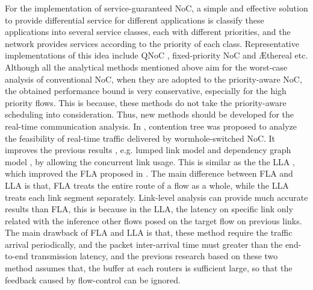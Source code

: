 \documentclass[10pt,journal]{IEEEtran}
\begin{document}
For the implementation of service-guaranteed NoC, a simple and effective solution to provide differential service for different applications is classify these applications into several service classes, each with different priorities, and the network provides services according to the priority of each class. Representative implementations of this idea include QNoC \cite{BCGK04}, fixed-priority NoC \cite{5685465} and {{\AE}thereal} \cite{GoDR05}\cite{RiGW01} etc. Although all the analytical methods mentioned above aim for the worst-case analysis of conventional NoC, when they are adopted to the priority-aware NoC, the obtained performance bound is very conservative, especially for the high priority flows. This is because, these methods do not take the priority-aware scheduling into consideration. Thus, new methods should be developed for the real-time communication analysis. In \cite{LuJS05}, contention tree was proposed to analyze the feasibility of real-time traffic delivered by wormhole-switched NoC. It improves the previous results , e.g. lumped link model \cite{707545} and dependency graph model \cite{708526}, by allowing the concurrent link usage. This is similar as the the LLA \cite{73}\cite{holisticNoC13}, which improved the FLA proposed in \cite{Shi:2008:RCA:1397757.1397996}. The main difference between FLA and LLA is that, FLA treats the entire route of a flow as a whole, while the LLA treats each link segment separately. Link-level analysis can provide much accurate results than FLA, this is because in the LLA, the latency on specific link only related with the inference other flows posed on the target flow on previous links. The main drawback of FLA and LLA is that, these method require the traffic arrival periodically, and the packet inter-arrival time must greater than the end-to-end transmission latency, and the previous research based on these two method assumes that, the buffer at each routers is sufficient large, so that the feedback caused by flow-control can be ignored.
\end{document}
